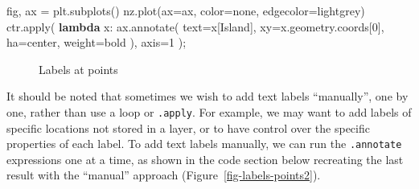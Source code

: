 \documentclass[
  letterpaper,
]{krantz}
\newenvironment{Shaded}{\begin{snugshade}}{\end{snugshade}}
\newcommand{\BuiltInTok}[1]{\textcolor[rgb]{0.00,0.23,0.31}{#1}}
\newcommand{\DecValTok}[1]{\textcolor[rgb]{0.68,0.00,0.00}{#1}}
\newcommand{\KeywordTok}[1]{\textcolor[rgb]{0.00,0.23,0.31}{\textbf{#1}}}
\newcommand{\NormalTok}[1]{\textcolor[rgb]{0.00,0.23,0.31}{#1}}
\newcommand{\OperatorTok}[1]{\textcolor[rgb]{0.37,0.37,0.37}{#1}}
\newcommand{\StringTok}[1]{\textcolor[rgb]{0.13,0.47,0.30}{#1}}
\begin{document}
\begin{Shaded}
\begin{Highlighting}[]
\NormalTok{fig, ax }\OperatorTok{=}\NormalTok{ plt.subplots()}
\NormalTok{nz.plot(ax}\OperatorTok{=}\NormalTok{ax, color}\OperatorTok{=}\StringTok{\textquotesingle{}none\textquotesingle{}}\NormalTok{, edgecolor}\OperatorTok{=}\StringTok{\textquotesingle{}lightgrey\textquotesingle{}}\NormalTok{)}
\NormalTok{ctr.}\BuiltInTok{apply}\NormalTok{(}
    \KeywordTok{lambda}\NormalTok{ x: ax.annotate(}
\NormalTok{        text}\OperatorTok{=}\NormalTok{x[}\StringTok{\textquotesingle{}Island\textquotesingle{}}\NormalTok{], }
\NormalTok{        xy}\OperatorTok{=}\NormalTok{x.geometry.coords[}\DecValTok{0}\NormalTok{], }
\NormalTok{        ha}\OperatorTok{=}\StringTok{\textquotesingle{}center\textquotesingle{}}\NormalTok{,}
\NormalTok{        weight}\OperatorTok{=}\StringTok{\textquotesingle{}bold\textquotesingle{}}
\NormalTok{    ), }
\NormalTok{    axis}\OperatorTok{=}\DecValTok{1}
\NormalTok{)}\OperatorTok{;}
\end{Highlighting}
\end{Shaded}

\begin{figure}[H]


\caption{\label{fig-labels-points1}Labels at points}

\end{figure}%

It should be noted that sometimes we wish to add text labels
``manually'', one by one, rather than use a loop or \texttt{.apply}. For
example, we may want to add labels of specific locations not stored in a
layer, or to have control over the specific properties of each label. To
add text labels manually, we can run the \texttt{.annotate} expressions
one at a time, as shown in the code section below recreating the last
result with the ``manual'' approach (Figure~\ref{fig-labels-points2}).
\end{document}
